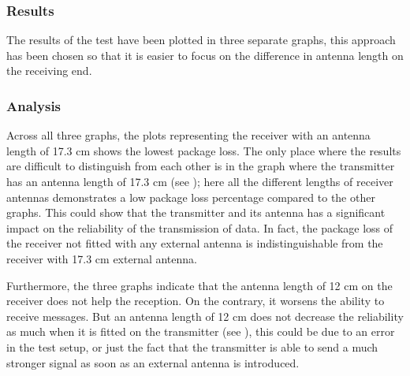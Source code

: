 

\subsubsection*{Results}
The results of the test have been plotted in three separate graphs, this approach has been chosen so that it is easier to focus on the difference in antenna length on the receiving end.


\subsubsection*{Analysis}
Across all three graphs, the plots representing the receiver with an antenna length of 17.3 cm shows the lowest package loss. 
The only place where the results are difficult to distinguish from each other is in the graph where the transmitter has an antenna length of 17.3 cm (see ); here all the different lengths of receiver antennas demonstrates a low package loss percentage compared to the other graphs.
This could show that the transmitter and its antenna has a significant impact on the reliability of the transmission of data.
In fact, the package loss of the receiver not fitted with any external antenna is indistinguishable from the receiver with 17.3 cm external antenna.

Furthermore, the three graphs indicate that the antenna length of 12 cm on the receiver does not help the reception.
On the contrary, it worsens the ability to receive messages.
But an antenna length of 12 cm does not decrease the reliability as much when it is fitted on the transmitter (see ), this could be due to an error in the test setup, or just the fact that the transmitter is able to send a much stronger signal as soon as an external antenna is introduced.

